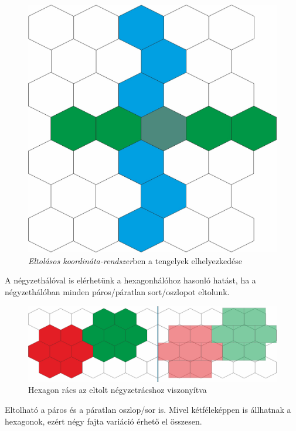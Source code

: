 \begin{figure}[h!]
\centering
\includegraphics[scale=0.2]{kepek/OffsetCoord.jpg}
\caption{\textit{Eltolásos koordináta-rendszer}ben a tengelyek elhelyezkedése}
\label{fig:OffsetCoord}
\end{figure}

\noindent A négyzethálóval is elérhetünk a hexagonhálóhoz hasonló hatást, ha a négyzethálóban minden páros/páratlan sort/oszlopot eltolunk.

\begin{figure}[h!]
\centering
\includegraphics[scale=0.25]{kepek/Hex_Sq.jpg}
\caption{Hexagon rács az eltolt négyzetrácshoz viszonyítva}
\label{fig:Hex_Sq}
\end{figure}

\noindent Eltolható a páros és a páratlan oszlop/sor is. Mivel kétféleképpen is állhatnak a hexagonok, ezért négy fajta variáció érhető el összesen.

